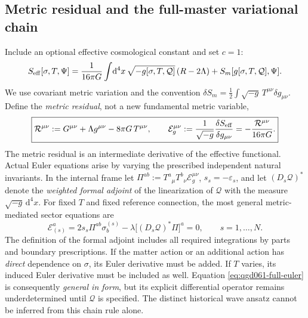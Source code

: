 \documentclass[11pt,a4paper]{article}
\newcommand{\dd}{\mathrm d}
\begin{document}
\subsection{Metric residual and the full-master variational chain}
Include an optional effective cosmological constant and set $c=1$:
\begin{equation}\label{eq:qgd061-action}
S_{\rm eff}[\sigma,T,\Psi]=\frac{1}{16\pi G}
\int\!\dd^4x\,\sqrt{-g[\sigma,T,\mathcal Q]}\,(R-2\Lambda)
+S_m[g[\sigma,T,\mathcal Q],\Psi].
\end{equation}
We use covariant metric variation and the convention
$\delta S_m=\frac12\int\sqrt{-g}\,T^{\mu\nu}\delta g_{\mu\nu}$.
Define the \emph{metric residual}, not a new fundamental metric variable,
\begin{equation}\label{eq:qgd061-metric-residual}
\boxed{\mathcal R^{\mu\nu}:=G^{\mu\nu}+\Lambda g^{\mu\nu}
-8\pi G\,T^{\mu\nu},\qquad
\mathcal E_g^{\mu\nu}:=\frac1{\sqrt{-g}}\frac{\delta S_{\rm eff}}
{\delta g_{\mu\nu}}=-\frac{\mathcal R^{\mu\nu}}{16\pi G}.}
\end{equation}
The metric residual is an intermediate derivative of the effective functional.
Actual Euler equations arise by varying the prescribed independent natural
invariants. In the internal frame let
$\Pi^{ab}:=T^a{}_\mu T^b{}_\nu\mathcal E_g^{\mu\nu}$,
$s_s=-\varepsilon_s$, and let
$(D_s\mathcal Q)^*$ denote the \emph{weighted formal adjoint} of the
linearization of $\mathcal Q$ with the measure $\sqrt{-g}\,\dd^4x$.
For fixed $T$ and fixed reference connection, the most general
metric-mediated sector equations are
\begin{equation}\label{eq:qgd061-full-euler}
\boxed{\mathcal E_{(s)}^{a}
=2s_s\Pi^{ab}\sigma_b^{(s)}
-\lambda\bigl[(D_s\mathcal Q)^*\Pi\bigr]^a=0,
\qquad s=1,\ldots,N.}
\end{equation}
The definition of the formal adjoint includes all required integrations by
parts and boundary prescriptions. If the matter action or an additional action
has \emph{direct} dependence on $\sigma$, its Euler derivative must be added.
If $T$ varies, its induced Euler derivative must be included as well. Equation
\eqref{eq:qgd061-full-euler} is consequently \emph{general in form}, but its
explicit differential operator remains underdetermined until $\mathcal Q$ is
specified. The distinct historical wave ansatz cannot be inferred from this
chain rule alone.
\end{document}
